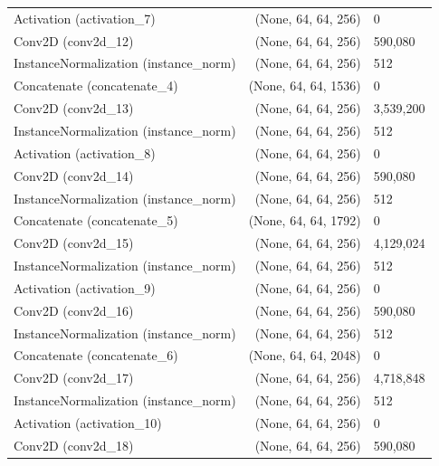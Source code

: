 \documentclass[12pt,DIV14,BCOR12mm,a4paper,footinclude=false,headinclude,parskip=half-,twoside,openright,cleardoublepage=empty,toc=index,bibliography=totoc,listof=totoc]{scrreprt}
\numberwithin{equation}{chapter}
\begin{document}
\begin{longtable}{lrl}
		Activation (activation\_7)            & (None, 64, 64, 256)         & 0                \\
		Conv2D (conv2d\_12)                  & (None, 64, 64, 256)         & 590,080          \\
		InstanceNormalization (instance\_norm) & (None, 64, 64, 256)         & 512              \\
		Concatenate (concatenate\_4)          & (None, 64, 64, 1536)        & 0                \\
		Conv2D (conv2d\_13)                  & (None, 64, 64, 256)         & 3,539,200        \\
		InstanceNormalization (instance\_norm) & (None, 64, 64, 256)         & 512              \\
		Activation (activation\_8)            & (None, 64, 64, 256)         & 0                \\
		Conv2D (conv2d\_14)                  & (None, 64, 64, 256)         & 590,080          \\
		InstanceNormalization (instance\_norm) & (None, 64, 64, 256)         & 512              \\
		Concatenate (concatenate\_5)          & (None, 64, 64, 1792)        & 0                \\
		Conv2D (conv2d\_15)                  & (None, 64, 64, 256)         & 4,129,024        \\
		InstanceNormalization (instance\_norm) & (None, 64, 64, 256)         & 512              \\
		Activation (activation\_9)            & (None, 64, 64, 256)         & 0                \\
		Conv2D (conv2d\_16)                  & (None, 64, 64, 256)         & 590,080          \\
		InstanceNormalization (instance\_norm) & (None, 64, 64, 256)         & 512              \\
		Concatenate (concatenate\_6)          & (None, 64, 64, 2048)        & 0                \\
		Conv2D (conv2d\_17)                  & (None, 64, 64, 256)         & 4,718,848        \\
		InstanceNormalization (instance\_norm) & (None, 64, 64, 256)         & 512              \\
		Activation (activation\_10)           & (None, 64, 64, 256)         & 0                \\
		Conv2D (conv2d\_18)                  & (None, 64, 64, 256)         & 590,080          \\

\end{longtable}
\end{document}
